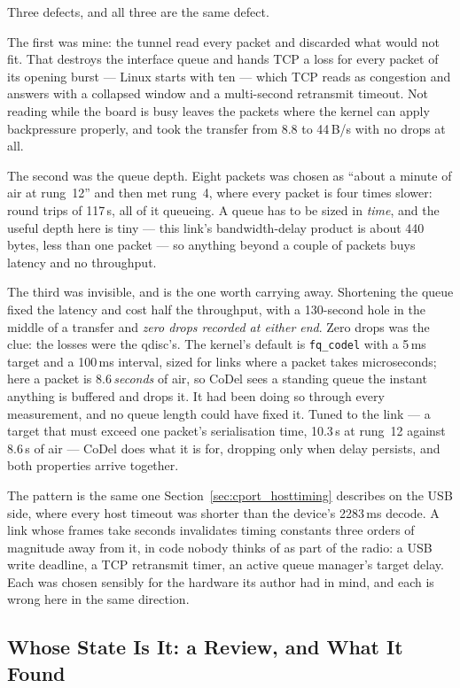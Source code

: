 Three defects, and all three are the same defect.

The first was mine: the tunnel read every packet and discarded what
would not fit.  That destroys the interface queue and hands TCP a loss
for every packet of its opening burst --- Linux starts with ten ---
which TCP reads as congestion and answers with a collapsed window and a
multi-second retransmit timeout.  Not reading while the board is busy
leaves the packets where the kernel can apply backpressure properly,
and took the transfer from 8.8 to 44\,B/s with no drops at all.

The second was the queue depth.  Eight packets was chosen as ``about a
minute of air at rung~12'' and then met rung~4, where every packet is
four times slower: round trips of 117\,s, all of it queueing.  A queue
has to be sized in \emph{time}, and the useful depth here is tiny ---
this link's bandwidth-delay product is about 440\,bytes, less than one
packet --- so anything beyond a couple of packets buys latency and no
throughput.

The third was invisible, and is the one worth carrying away.  Shortening
the queue fixed the latency and cost half the throughput, with a
130-second hole in the middle of a transfer and \emph{zero drops
recorded at either end}.  Zero drops was the clue: the losses were the
qdisc's.  The kernel's default is \texttt{fq\_codel} with a 5\,ms
target and a 100\,ms interval, sized for links where a packet takes
microseconds; here a packet is 8.6\,\emph{seconds} of air, so CoDel
sees a standing queue the instant anything is buffered and drops it.
It had been doing so through every measurement, and no queue length
could have fixed it.  Tuned to the link --- a target that must exceed
one packet's serialisation time, 10.3\,s at rung~12 against 8.6\,s of
air --- CoDel does what it is for, dropping only when delay persists,
and both properties arrive together.

The pattern is the same one Section~\ref{sec:cport_hosttiming}
describes on the USB side, where every host timeout was shorter than
the device's 2283\,ms decode.  A link whose frames take seconds
invalidates timing constants three orders of magnitude away from it,
in code nobody thinks of as part of the radio: a USB write deadline, a
TCP retransmit timer, an active queue manager's target delay.  Each was
chosen sensibly for the hardware its author had in mind, and each is
wrong here in the same direction.

\subsection{Whose State Is It: a Review, and What It Found}
\label{sec:cport_review}

